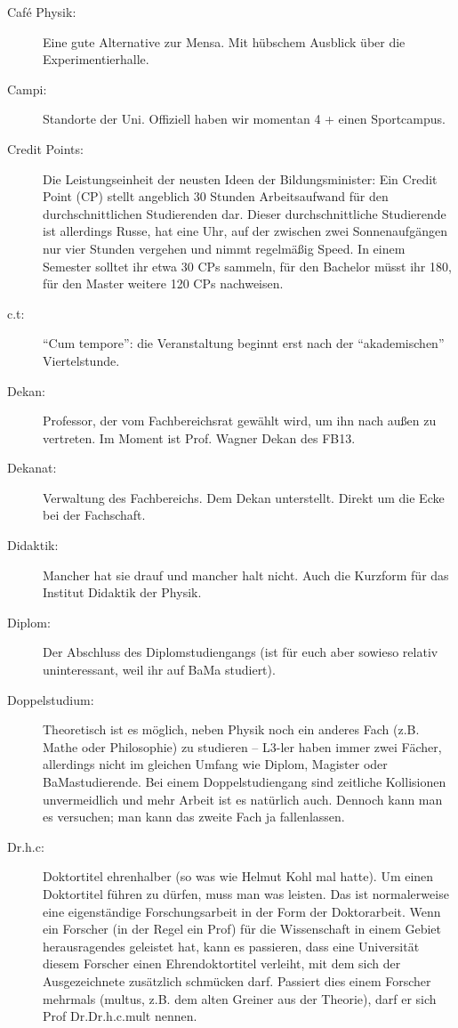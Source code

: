 \begin{description}
	\item[Café Physik:] Eine gute Alternative zur Mensa. Mit hübschem Ausblick über die Experimentierhalle.

	\item[Campi:] Standorte der Uni. Offiziell haben wir momentan 4 + einen Sportcampus.

   	\item[Credit Points:] Die Leistungseinheit der neusten Ideen der Bildungsminister: Ein Credit Point (CP) stellt angeblich 30 Stunden Arbeitsaufwand für den durchschnittlichen Studierenden dar. Dieser durchschnittliche Studierende ist allerdings Russe, hat eine Uhr, auf der zwischen zwei Sonnenaufgängen nur vier Stunden vergehen und nimmt regelmäßig Speed. In einem Semester solltet ihr etwa 30 CPs sammeln, für den Bachelor müsst ihr 180, für den Master weitere 120 CPs nachweisen.

    \item[c.t:] \enquote{Cum tempore}: die Veranstaltung beginnt erst nach der \enquote{akademischen} Viertelstunde.

    \item[Dekan:] Professor, der vom Fachbereichsrat gewählt wird, um ihn nach außen zu vertreten. Im Moment ist Prof. Wagner Dekan des FB13.

    \item[Dekanat:] Verwaltung des Fachbereichs. Dem Dekan unterstellt. Direkt um die Ecke bei der Fachschaft.

    \item[Didaktik:] Mancher hat sie drauf und mancher halt nicht. Auch die Kurzform für das Institut Didaktik der Physik.

    \item[Diplom:] Der Abschluss des Diplomstudiengangs (ist für euch aber sowieso relativ uninteressant, weil ihr auf BaMa studiert).

    \item[Doppelstudium:] Theoretisch ist es möglich, neben Physik noch ein anderes Fach (z.B. Mathe oder Philosophie) zu studieren -- L3-ler haben immer zwei Fächer, allerdings nicht im gleichen Umfang wie Diplom, Magister oder BaMastudierende. Bei einem Doppelstudiengang sind zeitliche Kollisionen unvermeidlich und mehr Arbeit ist es natürlich auch. Dennoch kann man es versuchen; man kann das zweite Fach ja fallenlassen.

    \item[Dr.h.c:] Doktortitel ehrenhalber (so was wie Helmut Kohl mal hatte). Um einen Doktortitel führen zu dürfen, muss man was leisten. Das ist normalerweise eine eigenständige Forschungsarbeit in der Form der Doktorarbeit. Wenn ein Forscher (in der Regel ein Prof) für die Wissenschaft in einem Gebiet herausragendes geleistet hat, kann es passieren, dass eine Universität diesem Forscher einen Ehrendoktortitel verleiht, mit dem sich der Ausgezeichnete zusätzlich schmücken darf. Passiert dies einem Forscher mehrmals (multus, z.B. dem alten Greiner aus der Theorie), darf er sich Prof Dr.Dr.h.c.mult nennen.


\end{description}
